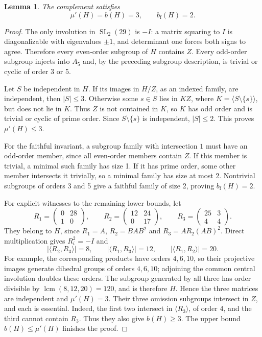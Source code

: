 \documentclass[11pt]{article}
\newtheorem{lemma}[theorem]{Lemma}
\theoremstyle{remark}\newtheorem{remark}[theorem]{Remark}
\newcommand{\mup}{\mu'}
\newcommand{\bfth}{b_{\mathrm f}}
\newcommand{\SL}{\operatorname{SL}}
\begin{document}
\begin{lemma}\label{lem:H}
The complement satisfies
\[
        \mup(H)=b(H)=3,\qquad \bfth(H)=2.
\]
\end{lemma}
\begin{proof}
The only involution in $\SL_2(29)$ is $-I$: a matrix squaring to $I$ is
diagonalizable with eigenvalues $\pm1$, and determinant one forces both
signs to agree. Therefore every even-order subgroup of $H$ contains $Z$.
Every odd-order subgroup injects into $A_5$ and, by the preceding subgroup
description, is trivial or cyclic of order 3 or 5.

Let $S$ be independent in $H$. If its images in $H/Z$, as an indexed family,
are independent, then $|S|\le3$. Otherwise some $s\in S$ lies in $KZ$, where
$K=\langle S\setminus\{s\}\rangle$, but does not lie in $K$. Thus $Z$ is not
contained in $K$, so $K$ has odd order and is trivial or cyclic of prime
order. Since $S\setminus\{s\}$ is independent, $|S|\le2$. This proves
$\mup(H)\le3$.

For the faithful invariant, a subgroup family with intersection $1$ must
have an odd-order member, since all even-order members contain $Z$. If this
member is trivial, a minimal such family has size 1. If it has prime order,
some other member intersects it trivially, so a minimal family has size at
most 2. Nontrivial subgroups of orders 3 and 5 give a faithful family of size
2, proving $\bfth(H)=2$.

For explicit witnesses to the remaining lower bounds, let
\begin{equation}\label{eq:R}
 R_1=\begin{pmatrix}0&28\\1&0\end{pmatrix},\qquad
 R_2=\begin{pmatrix}12&24\\0&17\end{pmatrix},\qquad
 R_3=\begin{pmatrix}25&3\\4&4\end{pmatrix}.
\end{equation}
They belong to $H$, since $R_1=A$, $R_2=BAB^2$ and
$R_3=AR_2(AB)^2$. Direct multiplication gives $R_i^2=-I$ and
\[
 |\langle R_2,R_3\rangle|=8,\qquad
 |\langle R_1,R_3\rangle|=12,\qquad
 |\langle R_1,R_2\rangle|=20.
\]
For example, the corresponding products have orders $4,6,10$, so their
projective images generate dihedral groups of orders $4,6,10$; adjoining the
common central involution doubles these orders. The subgroup generated by
all three has order divisible by $\operatorname{lcm}(8,12,20)=120$, and is
therefore $H$. Hence the three matrices are independent and $\mup(H)=3$.
Their three omission subgroups intersect in $Z$, and each is essential.
Indeed, the first two intersect in $\langle R_3\rangle$, of order 4, and the
third cannot contain $R_3$. Thus they also give $b(H)\ge3$. The upper bound
$b(H)\le\mup(H)$ finishes the proof.
\end{proof}
\end{document}
